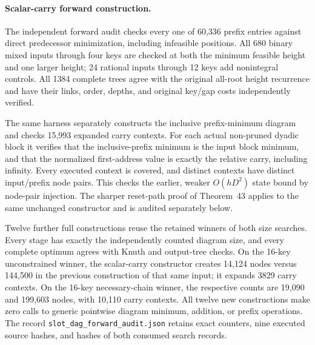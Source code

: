 \documentclass[11pt]{article}
\begin{document}
\paragraph{Scalar-carry forward construction.}
The independent forward audit checks every one of 60,336 prefix entries
against direct predecessor minimization, including infeasible positions.
All 680 binary mixed inputs through four keys are checked at both the
minimum feasible height and one larger height; 24 rational inputs through
12 keys add nonintegral controls. All 1384 complete trees agree with the
original all-root height recurrence and have their links, order, depths,
and original key/gap costs independently verified.

The same harness separately constructs the inclusive prefix-minimum
diagram and checks 15,993 expanded carry contexts. For each actual
non-pruned dyadic block it verifies that the inclusive-prefix minimum
is the input block minimum, and that the normalized first-address value
is exactly the relative carry, including infinity. Every executed context
is covered, and distinct contexts have distinct input/prefix node pairs.
This checks the earlier, weaker $O(hD^2)$ state bound by node-pair
injection. The sharper reset-path proof of Theorem~43
applies to the same unchanged constructor and is audited separately below.

Twelve further full constructions reuse the retained winners of both
size searches. Every stage has exactly the independently counted diagram
size, and every complete optimum agrees with Knuth and output-tree checks.
On the 16-key unconstrained winner, the scalar-carry constructor creates
14,124 nodes versus 144,500 in the previous construction of that same
input; it expands 3829 carry contexts. On the 16-key necessary-chain
winner, the respective counts are 19,090 and 199,603 nodes, with 10,110
carry contexts. All twelve new constructions make zero calls to generic
pointwise diagram minimum, addition, or prefix operations. The record
\texttt{slot\_dag\_forward\_audit.json} retains exact counters, nine executed
source hashes, and hashes of both consumed search records.
\end{document}
